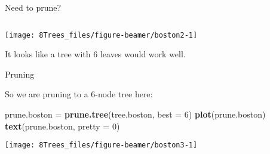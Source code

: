 \documentclass[10pt,ignorenonframetext,]{beamer}
\newenvironment{Shaded}{\begin{snugshade}}{\end{snugshade}}
\newcommand{\DataTypeTok}[1]{\textcolor[rgb]{0.13,0.29,0.53}{#1}}
\newcommand{\DecValTok}[1]{\textcolor[rgb]{0.00,0.00,0.81}{#1}}
\newcommand{\KeywordTok}[1]{\textcolor[rgb]{0.13,0.29,0.53}{\textbf{#1}}}
\newcommand{\NormalTok}[1]{#1}
\newcommand{\OperatorTok}[1]{\textcolor[rgb]{0.81,0.36,0.00}{\textbf{#1}}}
\newcommand{\StringTok}[1]{\textcolor[rgb]{0.31,0.60,0.02}{#1}}
\begin{document}
\begin{frame}[fragile]

\begin{block}{Need to prune?}

\(~\)

\scriptsize

\begin{Shaded}
\end{Shaded}

\begin{center}\texttt{[image: 8Trees\_files/figure-beamer/boston2-1]} \end{center}

\normalsize

\vspace{2mm}

It looks like a tree with 6 leaves would work well.

\end{block}

\end{frame}

\begin{frame}[fragile]

\begin{block}{Pruning}

\vspace{1mm}

So we are pruning to a 6-node tree here:

\scriptsize

\begin{Shaded}
\begin{Highlighting}[]
\NormalTok{prune.boston =}\StringTok{ }\KeywordTok{prune.tree}\NormalTok{(tree.boston, }\DataTypeTok{best =} \DecValTok{6}\NormalTok{)}
\KeywordTok{plot}\NormalTok{(prune.boston)}
\KeywordTok{text}\NormalTok{(prune.boston, }\DataTypeTok{pretty =} \DecValTok{0}\NormalTok{)}
\end{Highlighting}
\end{Shaded}

\begin{center}\texttt{[image: 8Trees\_files/figure-beamer/boston3-1]} \end{center}

\end{block}

\end{frame}
\end{document}
